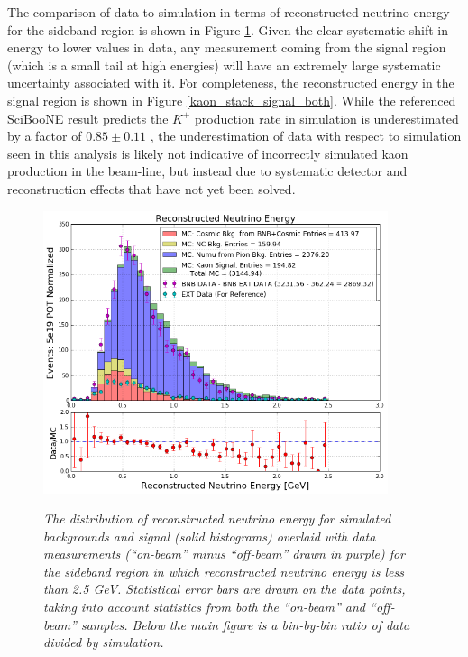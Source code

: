 The comparison of data to simulation in terms of reconstructed neutrino energy for the sideband region is shown in Figure \ref{kaon_stack_sideband_both}. Given the clear systematic shift in energy to lower values in data, any measurement coming from the signal region (which is a small tail at high energies) will have an extremely large systematic uncertainty associated with it. For completeness, the reconstructed energy in the signal region is shown in Figure \ref{kaon_stack_signal_both}. While the referenced SciBooNE result predicts the $K^+$ production rate in simulation is underestimated by a factor of $0.85\pm0.11$ \cite{gary_kaon_production_paper}, the underestimation of data with respect to simulation seen in this analysis is likely not indicative of incorrectly simulated kaon production in the beam-line, but instead due to systematic detector and reconstruction effects that have not yet been solved. %


\begin{figure}[ht!]
\centering
	\includegraphics[width=0.9\textwidth]{Figures/kaon_both_sideband.png} \\
\caption{\textit{The distribution of reconstructed neutrino energy for simulated backgrounds and signal (solid histograms) overlaid with data measurements (``on-beam'' minus ``off-beam'' drawn in purple) for the sideband region in which reconstructed neutrino energy is less than 2.5 GeV. Statistical error bars are drawn on the data points, taking into account statistics from both the ``on-beam'' and ``off-beam'' samples. Below the main figure is a bin-by-bin ratio of data divided by simulation.}}\label{kaon_stack_sideband_both}
\end{figure}


